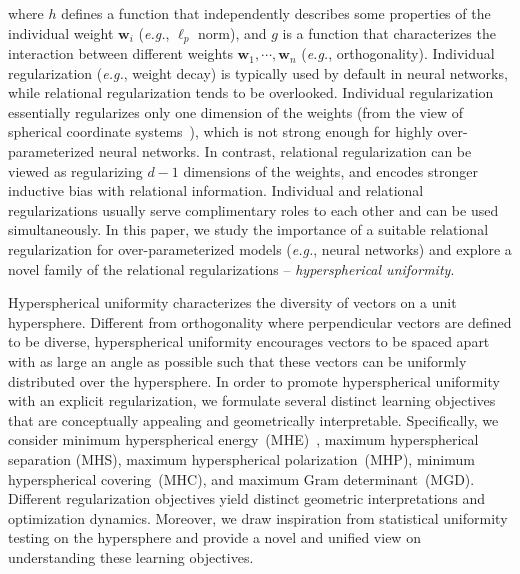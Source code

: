 where $h$ defines a function that independently describes some properties of the individual weight $\bm{w}_i$ (\emph{e.g.}, $\ell_p$ norm), and $g$ is a function that characterizes the interaction between different weights $\bm{w}_1,\cdots,\bm{w}_n$ (\emph{e.g.}, orthogonality). Individual regularization (\emph{e.g.}, weight decay) is typically used by default in neural networks, while relational regularization tends to be overlooked. Individual regularization essentially regularizes only one dimension of the weights (from the view of spherical coordinate systems~\cite{blumenson1960derivation}), which is not strong enough for highly over-parameterized neural networks. In contrast, relational regularization can be viewed as regularizing $d-1$ dimensions of the weights, and encodes stronger inductive bias with relational information. Individual and relational regularizations usually serve complimentary roles to each other and can be used simultaneously. In this paper, we study the importance of a suitable relational regularization for over-parameterized models (\emph{e.g.}, neural networks) and explore a novel family of the relational regularizations -- \emph{hyperspherical uniformity}.

Hyperspherical uniformity characterizes the diversity of vectors on a unit hypersphere. Different from orthogonality where perpendicular vectors are defined to be diverse, hyperspherical uniformity encourages vectors to be spaced apart with as large an angle as possible such that these vectors can be uniformly distributed over the hypersphere. In order to promote hyperspherical uniformity with an explicit regularization, we formulate several distinct learning objectives that are conceptually appealing and geometrically interpretable. Specifically, we consider minimum hyperspherical energy~(MHE)~\cite{liu2018learning}, maximum hyperspherical separation (MHS), maximum hyperspherical polarization~(MHP), minimum hyperspherical covering~(MHC), and maximum Gram determinant~(MGD). Different regularization objectives yield distinct geometric interpretations and optimization dynamics. Moreover, we draw inspiration from statistical uniformity testing on the hypersphere and provide a novel and unified view on understanding these learning objectives.

